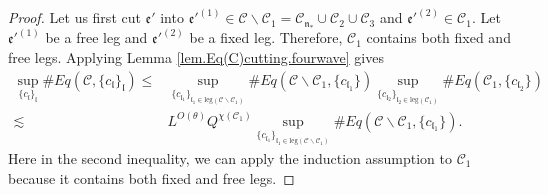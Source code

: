 \begin{proof}
    Let us first cut $\mathfrak{e}'$ into $\mathfrak{e}'^{(1)}\in \mathcal{C}\backslash\mathcal{C}_1=\mathcal{C}_{\mathfrak{n}_*}\cup \mathcal{C}_2\cup \mathcal{C}_3$ and $\mathfrak{e}'^{(2)}\in \mathcal{C}_1$. Let $\mathfrak{e}'^{(1)}$ be a free leg and $\mathfrak{e}'^{(2)}$ be a fixed leg. Therefore, $\mathcal{C}_1$ contains both fixed and free legs. Applying Lemma \ref{lem.Eq(C)cutting.fourwave} gives
    \begin{equation}\label{eq.case2expand.fourwave}
    \begin{split}
     \sup_{\{c_{\mathfrak{l}}\}_{\mathfrak{l}}}\#Eq(\mathcal{C},\{c_{\mathfrak{l}}\}_{\mathfrak{l}})\le&
     \sup_{\{c_{\mathfrak{l}_1}\}_{\mathfrak{l}_1\in \text{leg}(\mathcal{C}\backslash\mathcal{C}_1)} } \# Eq(\mathcal{C}\backslash\mathcal{C}_1,\{c_{\mathfrak{l}_1}\}) \sup_{\{c_{\mathfrak{l}_2}\}_{\mathfrak{l}_2\in \text{leg}(\mathcal{C}_1)} }\# Eq(\mathcal{C}_{1}, \{c_{\mathfrak{l}_2}\})
     \\
     \lesssim& L^{O(\theta)} Q^{\chi(\mathcal{C}_1)}\sup_{\{c_{\mathfrak{l}_1}\}_{\mathfrak{l}_1\in \text{leg}(\mathcal{C}\backslash\mathcal{C}_1)} } \# Eq(\mathcal{C}\backslash\mathcal{C}_1,\{c_{\mathfrak{l}_1}\}).
    \end{split}
    \end{equation}
    Here in the second inequality, we can apply the induction assumption to $\mathcal{C}_1$ because it contains both fixed and free legs.
    

\end{proof}
